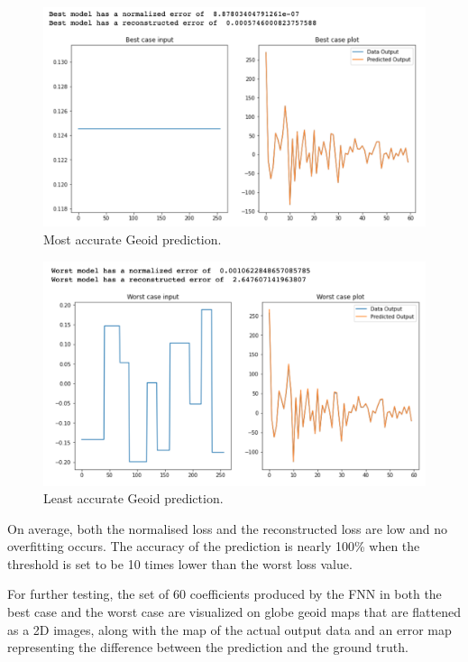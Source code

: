 \begin{figure}[H]
    \caption{Most accurate Geoid prediction.}
    \includegraphics[scale=0.6]{figures/geoid_images/Geoid_Best.png}
\end{figure}

\begin{figure}[H]
    \caption{Least accurate Geoid prediction.}
    \includegraphics[scale=0.6]{figures/geoid_images/Geoid_Worst.png}
\end{figure}

On average, both the normalised loss and the reconstructed loss are low and no overfitting occurs. The accuracy of the prediction is nearly 100\% when the threshold is set to be 10 times lower than the worst loss value. 

For further testing, the set of 60 coefficients produced by the FNN in both the best case and the worst case are visualized on globe geoid maps that are flattened as a 2D images, along with the map of the actual output data and an error map representing the difference between the prediction and the ground truth.

